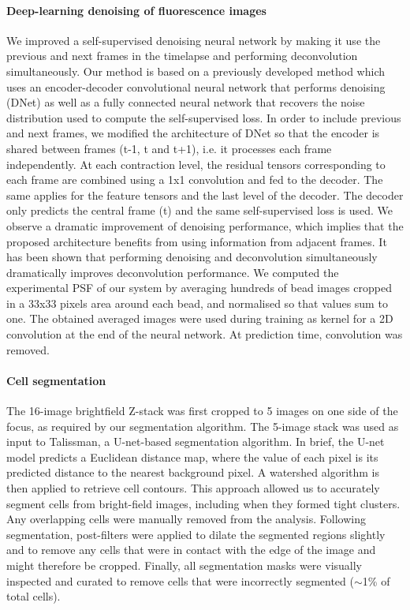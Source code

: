 \paragraph*{Deep-learning denoising of fluorescence images}
We improved a self-supervised denoising neural network by making it use the previous and next frames in the timelapse and performing deconvolution simultaneously. Our method is based on a previously developed method \cite{Ollion2021} which uses an encoder-decoder convolutional neural network that performs denoising (DNet) as well as a fully connected neural network that recovers the noise distribution used to compute the self-supervised loss. In order to include previous and next frames, we modified the architecture of DNet so that the encoder is shared between frames (t-1, t and t+1), i.e. it processes each frame independently. At each contraction level, the residual tensors corresponding to each frame are combined using a 1x1 convolution and fed to the decoder. The same applies for the feature tensors and the last level of the decoder. The decoder only predicts the central frame (t) and the same self-supervised loss is used. We observe a dramatic improvement of denoising performance, which implies that the proposed architecture benefits from using information from adjacent frames. It has been shown that performing denoising and deconvolution simultaneously dramatically improves deconvolution performance\cite{Kobayashi2020}. We computed the experimental PSF of our system by averaging hundreds of bead images cropped in a 33x33 pixels area around each bead, and normalised so that values sum to one. The obtained averaged images were used during training as kernel for a 2D convolution at the end of the neural network. At prediction time, convolution was removed.

\paragraph{Cell segmentation}
The 16-image brightfield Z-stack was first cropped to 5 images on one side of the focus, as required by our segmentation algorithm. The 5-image stack was used as input to Talissman, a U-net-based segmentation algorithm. In brief, the U-net model predicts a Euclidean distance map, where the value of each pixel is its predicted distance to the nearest background pixel. A watershed algorithm is then applied to retrieve cell contours. This approach allowed us to accurately segment cells from bright-field images, including when they formed tight clusters. Any overlapping cells were manually removed from the analysis. Following segmentation, post-filters were applied to dilate the segmented regions slightly and to remove any cells that were in contact with the edge of the image and might therefore be cropped. Finally, all segmentation masks were visually inspected and curated to remove cells that were incorrectly segmented ($\sim$1\% of total cells).

